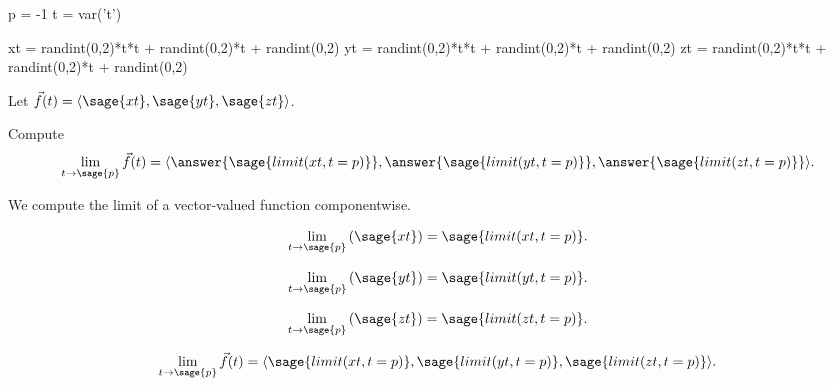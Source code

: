 \documentclass{ximera}
\author{Jim Fowler}
\begin{document}
\makerandom

\begin{sagesilent}
  p = -1
  t = var('t')
  
  xt = randint(0,2)*t*t + randint(0,2)*t + randint(0,2)
  yt = randint(0,2)*t*t + randint(0,2)*t + randint(0,2)
  zt = randint(0,2)*t*t + randint(0,2)*t + randint(0,2)
\end{sagesilent}

\begin{exercise}

  Let $\vec{f}(t) = \langle \sage{xt}, \sage{yt}, \sage{zt} \rangle$.

  Compute
  \[
    \lim_{t \to \sage{p}} \vec{f}(t) = \langle \answer{\sage{limit(xt,t=p)}}, \answer{\sage{limit(yt,t=p)}}, \answer{\sage{limit(zt,t=p)}} \rangle.
  \]
  
  \begin{hint}
    We compute the limit of a vector-valued function componentwise.
  \end{hint}

  \begin{hint}
    \[\lim_{t \to \sage{p}} \left( \sage{xt} \right) = \sage{limit(xt,t=p)}.\]
  \end{hint}

  \begin{hint}
    \[\lim_{t \to \sage{p}} \left( \sage{yt} \right) = \sage{limit(yt,t=p)}.\]
  \end{hint}

  \begin{hint}
    \[\lim_{t \to \sage{p}} \left( \sage{zt} \right) = \sage{limit(zt,t=p)}.\]
  \end{hint}
  
  \begin{hint}
    \[\lim_{t \to \sage{p}} \vec{f}(t) = \langle \sage{limit(xt,t=p)}, \sage{limit(yt,t=p)}, \sage{limit(zt,t=p)} \rangle.\]
  \end{hint}          
  
\end{exercise}
\end{document}
